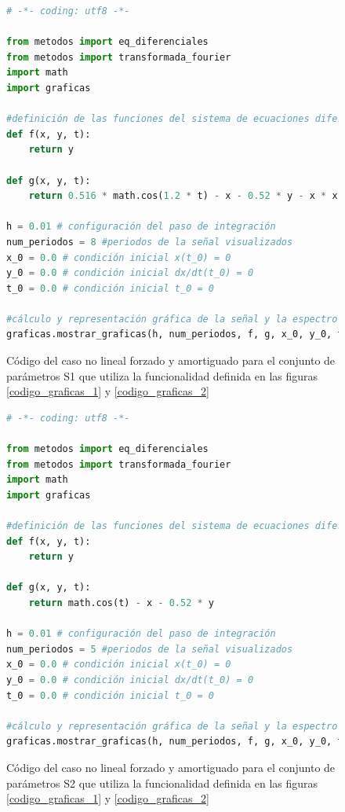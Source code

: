 \documentclass[11pt]{article}
\begin{document}
\begin{figure}
\begin{lstlisting}[language=Python]
# -*- coding: utf8 -*- 

from metodos import eq_diferenciales
from metodos import transformada_fourier
import math
import graficas

#definición de las funciones del sistema de ecuaciones diferenciales
def f(x, y, t):
	return y

def g(x, y, t):
	return 0.516 * math.cos(1.2 * t) - x - 0.52 * y - x * x

h = 0.01 # configuración del paso de integración
num_periodos = 8 #periodos de la señal visualizados
x_0 = 0.0 # condición inicial x(t_0) = 0
y_0 = 0.0 # condición inicial dx/dt(t_0) = 0
t_0 = 0.0 # condición inicial t_0 = 0

#cálculo y representación gráfica de la señal y la espectro de potencias
graficas.mostrar_graficas(h, num_periodos, f, g, x_0, y_0, t_0, 'oscilador no lineal forzado y amortiguado - S1', 'memoria/caso_anarmonico_s1.pdf')
\end{lstlisting}
\caption{Código del caso no lineal forzado y amortiguado para el conjunto de parámetros S1 que utiliza la funcionalidad definida en las
figuras \ref{codigo_graficas_1} y \ref{codigo_graficas_2}}
\end{figure}

\begin{figure}
\begin{lstlisting}[language=Python]
# -*- coding: utf8 -*- 

from metodos import eq_diferenciales
from metodos import transformada_fourier
import math
import graficas

#definición de las funciones del sistema de ecuaciones diferenciales
def f(x, y, t):
	return y

def g(x, y, t):
	return math.cos(t) - x - 0.52 * y

h = 0.01 # configuración del paso de integración
num_periodos = 5 #periodos de la señal visualizados
x_0 = 0.0 # condición inicial x(t_0) = 0
y_0 = 0.0 # condición inicial dx/dt(t_0) = 0
t_0 = 0.0 # condición inicial t_0 = 0

#cálculo y representación gráfica de la señal y la espectro de potencias
graficas.mostrar_graficas(h, num_periodos, f, g, x_0, y_0, t_0, 'oscilador lineal forzado y amortiguado', 'memoria/caso_forzado_amortiguado.pdf')
\end{lstlisting}
\caption{Código del caso no lineal forzado y amortiguado para el conjunto de parámetros S2 que utiliza la funcionalidad definida en las
figuras \ref{codigo_graficas_1} y \ref{codigo_graficas_2}}
\end{figure}
\end{document}

